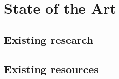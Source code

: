 \chapter{State of the Art}

\vspace{0.5cm}

\section{Existing research}

\section{Existing resources}
